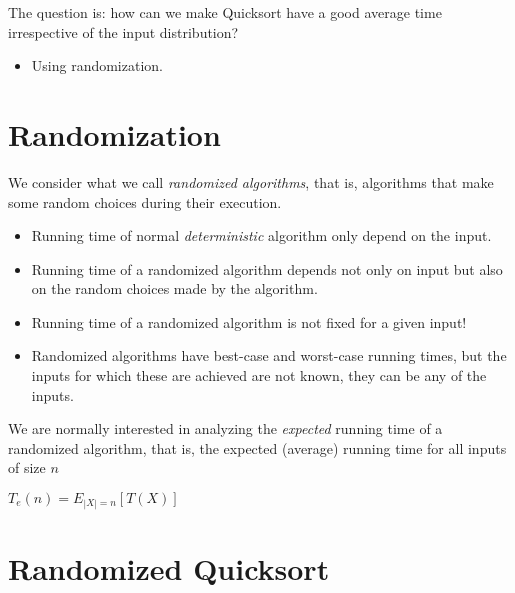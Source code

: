 \documentclass[11pt]{article}
\begin{document}
The question is: how can we make {\sc Quicksort} have a good average time
irrespective of the input distribution? 
\begin{itemize}
\item Using randomization.
\end{itemize}





\section*{Randomization}


We consider what we call \emph{randomized algorithms}, that is,
  algorithms that make some random choices during their execution.

  \begin{itemize}
  \item Running time of normal \emph{deterministic} algorithm only
  depend on the input.
  \item Running time of a randomized algorithm depends not only on
  input but also on the random choices made by the algorithm.
  \item Running time of a randomized algorithm is not fixed for a given input!

\item Randomized algorithms have best-case and worst-case running
times, but the inputs for which these are achieved are not known, they
can be any of the inputs.
  \end{itemize}

 We are normally interested in analyzing the \emph{expected} running
time of a randomized algorithm, that is, the expected (average)
running time for all inputs of size $n$ \\

  \centerline{$T_e(n)=E_{|X|=n}[T(X)]$}



\section*{Randomized Quicksort}
\end{document}
